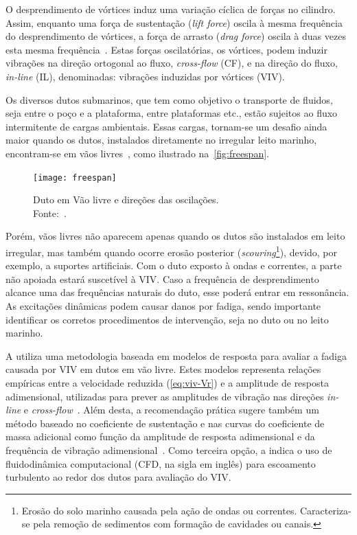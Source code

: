 O desprendimento de vórtices induz uma variação cíclica de forças no cilindro.
Assim, enquanto uma força de sustentação (\textit{lift force}) oscila à mesma frequência do desprendimento de vórtices, a força de arrasto (\textit{drag force}) oscila à duas vezes esta mesma frequência~\cite{Sumer1995}.
Estas forças oscilatórias, os vórtices, podem induzir vibrações na direção ortogonal ao fluxo, \textit{cross-flow} (CF), e na direção do fluxo, \textit{in-line} (IL), denominadas: vibrações induzidas por vórtices (VIV).

Os diversos dutos submarinos, que tem como objetivo o transporte de fluidos, seja entre o poço e a plataforma, entre plataformas etc., estão sujeitos ao fluxo intermitente de cargas ambientais.
Essas cargas, tornam-se um desafio ainda maior quando os dutos, instalados diretamente no irregular leito marinho, encontram-se em vãos livres~\cite{Fyrileiv1998}, como ilustrado na~\autoref{fig:freespan}.

\begin{figure}[!h]
	\centering
	\texttt{[image: freespan]}
	\caption[Duto em Vão livre e direções das oscilações]{Duto em Vão livre e direções das oscilações.\\Fonte:~\cite{DNV2017}.}\label{fig:freespan}
\end{figure}

Porém, vãos livres não aparecem apenas quando os dutos são instalados em leito irregular, mas também quando ocorre erosão posterior (\textit{scouring}\footnote{Erosão do solo marinho causada pela ação de ondas ou correntes. Caracteriza-se pela remoção de sedimentos com formação de cavidades ou canais.}), devido, por exemplo, a suportes artificiais.
Com o duto exposto à ondas e correntes, a parte não apoiada estará suscetível à VIV.
Caso a frequência de desprendimento alcance uma das frequências naturais do duto, esse poderá entrar em ressonância.
As excitações dinâmicas podem causar danos por fadiga, sendo importante identificar os corretos procedimentos de intervenção, seja no duto ou no leito marinho.

A  utiliza uma metodologia baseada em modelos de resposta para avaliar a fadiga causada por VIV em dutos em vão livre.
Estes modelos representa relações empíricas entre a velocidade reduzida (\autoref{eq:viv-Vr}) e a amplitude de resposta adimensional, utilizadas para prever as amplitudes de vibração nas direções \textit{in-line} e \textit{cross-flow}~\cite{Mork2003,DNV2017}.
Além desta, a recomendação prática sugere também um método baseado no coeficiente de sustentação e nas curvas do coeficiente de massa adicional como função da amplitude de resposta adimensional e da frequência de vibração adimensional~\cite{DNV2017}.
Como terceira opção, a  indica o uso de fluidodinâmica computacional (CFD, na sigla em inglês) para escoamento turbulento ao redor dos dutos para avaliação do VIV.

